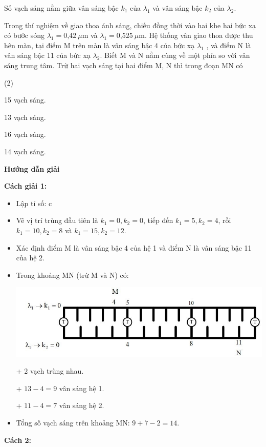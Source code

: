 \begin{dang}{Số vạch sáng nằm giữa vân sáng bậc $k_1$ của $\lambda_1$ và vân sáng bậc $k_2$ của $\lambda_2$.}
	{
Trong thí nghiệm về giao thoa ánh sáng, chiếu đồng thời vào hai khe hai bức xạ có bước sóng $\lambda_1 = \text{0,42}\ \mu \text{m}$ và $\lambda_1 = \text{0,525}\ \mu \text{m}$. Hệ thống vân giao thoa được thu hên màn, tại điểm M trên màn là vân sáng bậc 4 của bức xạ $\lambda_1$ , và điểm N là vân sáng bậc 11 của bức xạ $\lambda_2$. Biết M và N nằm cùng về một phía so với vân sáng trung tâm. Trừ hai vạch sáng tại hai điểm M, N thì trong đoạn MN có
\begin{mcq}(2)
\item 15 vạch sáng. 
\item 13 vạch sáng. 		
\item 16 vạch sáng.  		 
\item 14 vạch sáng.
\end{mcq}
}
{\begin{center}
	\textbf{Hướng dẫn giải}
\end{center}
\textbf{Cách giải 1:}
\begin{itemize}
	\item Lập tỉ số: 
	c
	\item Vẽ vị trí trùng đầu tiên là $k_1 = 0, k_2 = 0$, tiếp đến $k_1 = 5, k_2 = 4$, rồi $k_1 = 10, k_2 = 8$ và $k_1 = 15, k_2 = 12$.
	\item Xác định điểm M là vân sáng bậc 4 của hệ 1 và điểm N là vân sáng bậc 11 của hệ 2.
	\item Trong khoảng MN (trừ M và N) có: 
	
\begin{center}
	\includegraphics[scale=0.7]{../figs/VN12-PH-33-A-017-2-1.JPG}
\end{center}	
	
	+ 2 vạch trùng nhau.
	
	+ $13-4=9$ vân sáng hệ 1.
	
	+ $11-4=7$ vân sáng hệ 2.
	\item Tổng số vạch sáng trên khoảng MN: $9+7-2=14$.   
	
\end{itemize}

\textbf{Cách 2:}

}
\end{dang}
